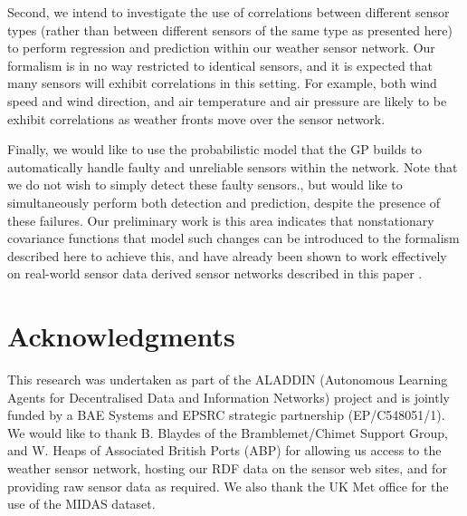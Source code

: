 \documentclass{acmtrans2m}
\begin{document}
Second, we intend to investigate the use of correlations between different sensor types (rather than between different sensors of the same type as presented here) to perform regression and prediction within our weather sensor network. Our formalism is in no way restricted to identical sensors, and it is expected that many sensors will exhibit correlations in this setting. For example, both wind speed and wind direction, and air temperature and air pressure are likely to be exhibit correlations as weather fronts move over the sensor network.

Finally, we would like to use the probabilistic model that the GP builds to automatically handle faulty and unreliable sensors within the network. Note that we do not wish to simply detect these faulty sensors., but would like to simultaneously perform both detection and prediction, despite the presence of these failures. Our preliminary work is this area indicates that nonstationary covariance functions that model such changes can be introduced to the formalism described here to achieve this, and have already been shown to work effectively on real-world sensor data derived sensor networks described in this paper \cite{changepoint}.

\section*{Acknowledgments}

\noindent This research was undertaken as part of the ALADDIN (Autonomous Learning Agents for Decentralised Data and Information Networks) project and is jointly funded by a BAE Systems and EPSRC strategic partnership (EP/C548051/1). We would like to thank B. Blaydes of the Bramblemet/Chimet Support Group, and W. Heaps of Associated British Ports (ABP) for allowing us access to the weather sensor network, hosting our RDF data on the sensor web sites, and for providing raw sensor data as required. We also thank the UK Met office for the use of
the MIDAS dataset.

 


\end{document}
